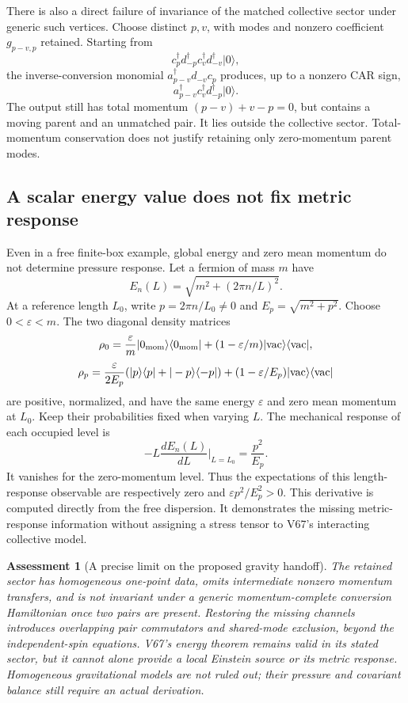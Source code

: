 \documentclass[11pt]{article}
\newtheorem{assessment}[theorem]{Assessment}
\theoremstyle{remark}
\begin{document}
There is also a direct failure of invariance of the
matched collective sector under generic such vertices.
Choose distinct \(p,v\), with modes and nonzero
coefficient \(g_{p-v,p}\) retained.  Starting from
\[
 c_p^\dagger d_{-p}^\dagger
 c_v^\dagger d_{-v}^\dagger|0\rangle ,
\]
the inverse-conversion monomial
\(a_{p-v}^\dagger d_{-v}c_p\) produces, up to a nonzero
CAR sign,
\[
 a_{p-v}^\dagger c_v^\dagger d_{-p}^\dagger|0\rangle .
\]
The output still has total momentum
\((p-v)+v-p=0\), but contains a moving parent and
an unmatched pair.  It lies outside the collective
sector.  Total-momentum conservation does not
justify retaining only zero-momentum parent modes.

\subsection{A scalar energy value does not fix metric response}

Even in a free finite-box example, global energy and
zero mean momentum do not determine pressure response.
Let a fermion of mass \(m\) have
\[
 E_n(L)=\sqrt{m^2+(2\pi n/L)^2}.
\]
At a reference length \(L_0\), write \(p=2\pi n/L_0\ne0\)
and \(E_p=\sqrt{m^2+p^2}\).  Choose \(0<\varepsilon<m\).
The two diagonal density matrices
\[
 \rho_0=\frac{\varepsilon}{m}|0_{\rm mom}\rangle
          \langle0_{\rm mom}|+
              (1-\varepsilon/m)|{\rm vac}\rangle\langle{\rm vac}|,
\]
\[
 \rho_p=\frac{\varepsilon}{2E_p}
       (|p\rangle\langle p|+|-p\rangle\langle-p|)
              +(1-\varepsilon/E_p)|{\rm vac}\rangle\langle{\rm vac}|
\]
are positive, normalized, and have the same energy
\(\varepsilon\) and zero mean momentum at \(L_0\).
Keep their probabilities fixed when varying \(L\).
The mechanical response of each occupied level is
\[
 -L\frac{dE_n(L)}{dL}\bigg|_{L=L_0}=\frac{p^2}{E_p}.
\]
It vanishes for the zero-momentum level.  Thus the
expectations of this length-response observable are
respectively zero and
\(\varepsilon p^2/E_p^2>0\).
This derivative is computed directly from the free
dispersion.  It demonstrates the missing metric-response
information without assigning a stress tensor to
V67's interacting collective model.

\begin{assessment}[A precise limit on the proposed gravity handoff]
\label{ass:v20v68}
The retained sector has homogeneous one-point data,
omits intermediate nonzero momentum transfers, and
is not invariant under a generic momentum-complete
conversion Hamiltonian once two pairs are present.
Restoring the missing channels introduces overlapping
pair commutators and shared-mode exclusion, beyond
the independent-spin equations.  V67's energy theorem
remains valid in its stated sector, but it cannot
alone provide a local Einstein source or its metric
response.  Homogeneous gravitational models are not
ruled out; their pressure and covariant balance
still require an actual derivation.
\end{assessment}
\end{document}
